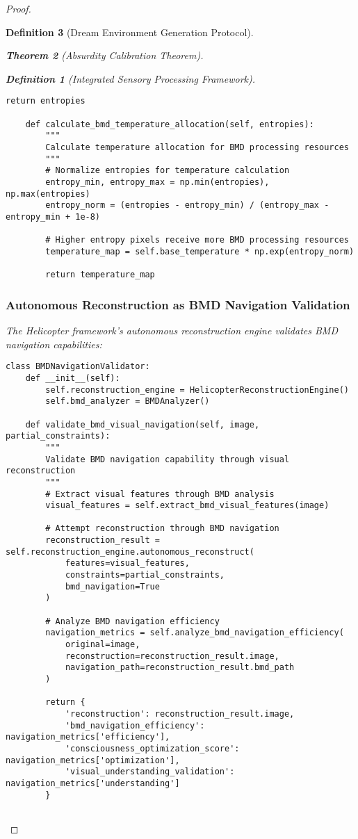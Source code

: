 \documentclass[12pt,a4paper]{article}
\newtheorem{theorem}{Theorem}[section]
\newtheorem{definition}[theorem]{Definition}
\begin{document}
\begin{proof}
\begin{definition}[Dream Environment Generation Protocol]
\begin{theorem}[Absurdity Calibration Theorem]
\begin{observation}
\begin{definition}[Integrated Sensory Processing Framework]
\begin{lstlisting}[style=pythonstyle, caption=BMD Thermodynamic Pixel Processing]
        return entropies
    
    def calculate_bmd_temperature_allocation(self, entropies):
        """
        Calculate temperature allocation for BMD processing resources
        """
        # Normalize entropies for temperature calculation
        entropy_min, entropy_max = np.min(entropies), np.max(entropies)
        entropy_norm = (entropies - entropy_min) / (entropy_max - entropy_min + 1e-8)
        
        # Higher entropy pixels receive more BMD processing resources
        temperature_map = self.base_temperature * np.exp(entropy_norm)
        
        return temperature_map
\end{lstlisting}

\subsubsection{Autonomous Reconstruction as BMD Navigation Validation}

The Helicopter framework's autonomous reconstruction engine validates BMD navigation capabilities:

\begin{lstlisting}[style=pythonstyle, caption=BMD Navigation Validation Through Visual Reconstruction]
class BMDNavigationValidator:
    def __init__(self):
        self.reconstruction_engine = HelicopterReconstructionEngine()
        self.bmd_analyzer = BMDAnalyzer()
        
    def validate_bmd_visual_navigation(self, image, partial_constraints):
        """
        Validate BMD navigation capability through visual reconstruction
        """
        # Extract visual features through BMD analysis
        visual_features = self.extract_bmd_visual_features(image)
        
        # Attempt reconstruction through BMD navigation
        reconstruction_result = self.reconstruction_engine.autonomous_reconstruct(
            features=visual_features,
            constraints=partial_constraints,
            bmd_navigation=True
        )
        
        # Analyze BMD navigation efficiency
        navigation_metrics = self.analyze_bmd_navigation_efficiency(
            original=image,
            reconstruction=reconstruction_result.image,
            navigation_path=reconstruction_result.bmd_path
        )
        
        return {
            'reconstruction': reconstruction_result.image,
            'bmd_navigation_efficiency': navigation_metrics['efficiency'],
            'consciousness_optimization_score': navigation_metrics['optimization'],
            'visual_understanding_validation': navigation_metrics['understanding']
        }
    

\end{lstlisting}
\end{definition}
\end{observation}
\end{theorem}
\end{definition}
\end{proof}
\end{document}
